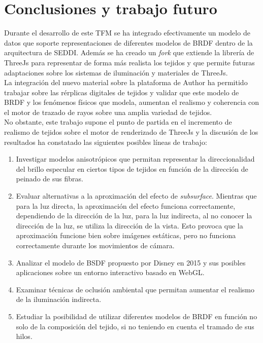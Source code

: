 \chapter{Conclusiones y trabajo futuro}

Durante el desarrollo de este TFM se ha integrado efectivamente un modelo de datos que soporte representaciones de diferentes modelos de BRDF dentro de la arquitectura de SEDDI.
Adem\'as se ha creado un \textit{fork} que extiende la librer\'ia de ThreeJs para representar de forma m\'as realista los tejidos y que permite futuras adaptaciones sobre los
sistemas de iluminaci\'on y materiales de ThreeJs.\\

La integraci\'on del nuevo material sobre la plataforma de Author ha permitido trabajar sobre las r\'erplicas digitales de tejidos
y validar que este modelo de BRDF y los fen\'omenos f\'isicos que modela, aumentan el realismo y coherencia
con el motor de trazado de rayos sobre una amplia variedad de tejidos.\\

No obstante, este trabajo supone el punto de partida en el incremento de realismo de tejidos sobre el motor de renderizado de ThreeJs
y la discusi\'on de los resultados ha constatado las siguientes posibles l\'ineas de trabajo:

\begin{enumerate}
	\item Investigar modelos anisotr\'opicos que permitan representar la direccionalidad del brillo especular en ciertos
    tipos de tejidos en funci\'on de la direcci\'on de peinado de sus fibras.
    \item Evaluar alternativas a la aproximaci\'on del efecto de \textit{subsurface}. Mientras que para la luz directa,
    la aproximaci\'on del efecto funciona correctamente, dependiendo de la direcci\'on de la luz, para la luz indirecta,
    al no conocer la direcci\'on de la luz, se utiliza la direcci\'on de la vista. Esto provoca que la aproximaci\'on
    funcione bien sobre im\'agenes est\'aticas, pero no funciona correctamente durante los movimientos de c\'amara.
    \item Analizar el modelo de BSDF propuesto por Disney en 2015 \autocite{disney15} y sus posibles aplicaciones sobre un
    entorno interactivo basado en WebGL.
    \item Examinar t\'ecnicas de oclusi\'on ambiental que permitan aumentar el realismo de la iluminaci\'on indirecta.
    \item Estudiar la posibilidad de utilizar diferentes modelos de BRDF en funci\'on no solo de la composici\'on del
    tejido, si no teniendo en cuenta el tramado de sus hilos.
\end{enumerate}


